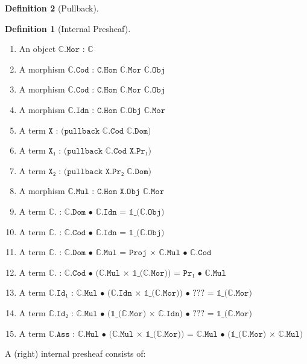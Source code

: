 \documentclass{book}
\theoremstyle{definition}
\newtheorem{definition}{Definition}
\begin{document}
\begin{definition}[Pullback]
\begin{definition}[Internal Presheaf] 
\begin{enumerate}
\item An object $\texttt{ℂ.Mor : ℂ}$ 
\item A morphism $\texttt{ℂ.Cod : C.Hom ℂ.Mor ℂ.Obj}$
\item A morphism $\texttt{ℂ.Cod : C.Hom ℂ.Mor ℂ.Obj}$
\item A morphism $\texttt{ℂ.Idn : C.Hom ℂ.Obj ℂ.Mor}$
\item A term $\texttt{X : (pullback ℂ.Cod ℂ.Dom)}$
\item A term $\texttt{X₁ : (pullback ℂ.Cod X.Pr₁)}$
\item A term $\texttt{X₂ : (pullback X.Pr₂ ℂ.Dom)}$
\item A morphism $\texttt{ℂ.Mul : C.Hom X.Obj ℂ.Mor}$
\item A term $\texttt{ℂ. : ℂ.Dom • ℂ.Idn = 𝟙\_(ℂ.Obj)}$
\item A term $\texttt{ℂ. : ℂ.Cod • ℂ.Idn = 𝟙\_(ℂ.Obj)}$
\item A term $\texttt{ℂ. : ℂ.Dom • ℂ.Mul =  Proj × ℂ.Mul • ℂ.Cod}$
\item A term $\texttt{ℂ. : ℂ.Cod • (ℂ.Mul × 𝟙\_(ℂ.Mor)) = Pr₁ • ℂ.Mul}$
\item A term $\texttt{ℂ.Id₁ : ℂ.Mul • (ℂ.Idn × 𝟙\_(ℂ.Mor)) • ??? = 𝟙\_(ℂ.Mor)}$
\item A term $\texttt{ℂ.Id₂ : ℂ.Mul • (𝟙\_(ℂ.Mor) × ℂ.Idn) • ??? = 𝟙\_(ℂ.Mor)}$
\item A term $\texttt{ℂ.Ass : ℂ.Mul • (ℂ.Mul × 𝟙\_(ℂ.Mor)) = ℂ.Mul • (𝟙\_(ℂ.Mor) × ℂ.Mul)}$
\end{enumerate}
\end{definition}

A (right) internal presheaf consists of:


\end{definition}
\end{document}
